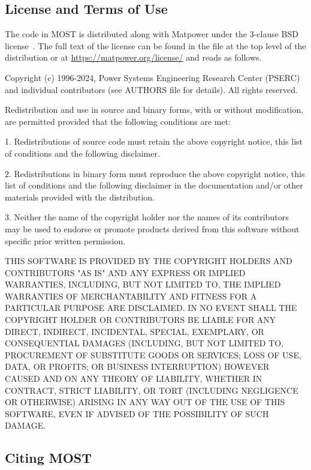 \documentclass[12pt]{article}
\newcommand{\matpower}[0]{{\sc Matpower}}
\newcommand{\most}[0]{{MOST}}
\newcommand{\code}[1]{{\relsize{-0.5}{\tt{{#1}}}}}  %
\numberwithin{equation}{section}
\numberwithin{table}{section}
\numberwithin{figure}{section}
\begin{document}
\subsection{License and Terms of Use}

The code in \most{} is distributed along with \matpower{} under the 3-clause BSD license~\cite{bsd}. The full text of the license can be found in the \code{LICENSE} file at the top level of the distribution or at \url{https://matpower.org/license/} and reads as follows.

\begin{Notice}
Copyright (c) 1996-2024, Power Systems Engineering Research Center
(PSERC) and individual contributors (see AUTHORS file for details).
All rights reserved.

Redistribution and use in source and binary forms, with or without
modification, are permitted provided that the following conditions
are met:

1. Redistributions of source code must retain the above copyright
notice, this list of conditions and the following disclaimer.

2. Redistributions in binary form must reproduce the above copyright
notice, this list of conditions and the following disclaimer in the
documentation and/or other materials provided with the distribution.

3. Neither the name of the copyright holder nor the names of its
contributors may be used to endorse or promote products derived from
this software without specific prior written permission.

THIS SOFTWARE IS PROVIDED BY THE COPYRIGHT HOLDERS AND CONTRIBUTORS
"AS IS" AND ANY EXPRESS OR IMPLIED WARRANTIES, INCLUDING, BUT NOT
LIMITED TO, THE IMPLIED WARRANTIES OF MERCHANTABILITY AND FITNESS
FOR A PARTICULAR PURPOSE ARE DISCLAIMED. IN NO EVENT SHALL THE
COPYRIGHT HOLDER OR CONTRIBUTORS BE LIABLE FOR ANY DIRECT, INDIRECT,
INCIDENTAL, SPECIAL, EXEMPLARY, OR CONSEQUENTIAL DAMAGES (INCLUDING,
BUT NOT LIMITED TO, PROCUREMENT OF SUBSTITUTE GOODS OR SERVICES;
LOSS OF USE, DATA, OR PROFITS; OR BUSINESS INTERRUPTION) HOWEVER
CAUSED AND ON ANY THEORY OF LIABILITY, WHETHER IN CONTRACT, STRICT
LIABILITY, OR TORT (INCLUDING NEGLIGENCE OR OTHERWISE) ARISING IN
ANY WAY OUT OF THE USE OF THIS SOFTWARE, EVEN IF ADVISED OF THE
POSSIBILITY OF SUCH DAMAGE.
\end{Notice}

\subsection{Citing \most{}}
\end{document}
